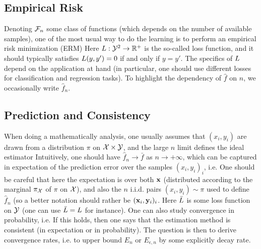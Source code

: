 \subsection{Empirical Risk}

Denoting $\mathcal{F}_n$ some class of functions (which depends on the number of available samples), one of the most usual way to do the learning is to perform an empirical risk minimization (ERM)
Here $L : \mathcal{Y}^2 \rightarrow \mathbb{R}^+$ is the so-called loss function, and it should typically satisfies $L(y,y')=0$ if and only if $y=y'$. %
The specifics of $L$ depend on the application at hand (in particular, one should use different losses for classification and regression tasks). 
%
To highlight the dependency of $\hat f$ on $n$, we occasionally write $\hat f_n$. 


\subsection{Prediction and Consistency}

When doing a mathematically analysis, one usually assumes that $(x_i,y_i)$ are drawn from a distribution $\pi$ on $\mathcal{X} \times \mathcal{Y}$, and the large $n$ limit defines the ideal estimator
Intuitively, one should have $\hat f_n \rightarrow \bar f$ as $n \rightarrow +\infty$, which can be captured in expectation of the prediction error over the samples $(x_i,y_i)_i$, i.e.
One should be careful that here the expectation is over both $\mathrm{\bf x}$ (distributed according to the marginal $\pi_{\mathcal{X}}$ of $\pi$ on $\mathcal{X}$), and also the $n$ i.i.d. pairs $(x_i,y_i) \sim \pi$ used to define $\hat f_n$ (so a better notation should rather be $(\mathrm{\bf x}_i,\mathrm{\bf y}_i)_i$.
%
Here $\bar{L}$ is some loss function on $\mathcal{Y}$ (one can use $\bar{L}=L$ for instance).
One can also study convergence in probability, i.e. 
If this holds, then one says that the estimation method is consistent (in expectation or in probability). 
%
The question is then to derive convergence rates, i.e. to upper bound $E_n$ or $E_{\epsilon,n}$ by some explicitly decay rate. 

